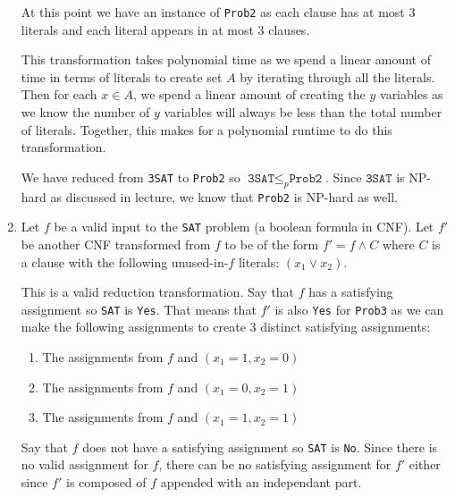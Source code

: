 \documentclass{article}
\begin{document}
\begin{enumerate}
                At this point we have an instance of \texttt{Prob2} as each clause has at most 3 literals and each literal appears in at most 3 clauses.
                

                This transformation takes polynomial time as we spend a linear amount of time in terms of literals to create set $A$ by iterating through all the literals.
                Then for each $x \in A$, we spend a linear amount of creating the $y$ variables as we know the number of $y$ variables will always be less than the total number of literals. 
                Together, this makes for a polynomial runtime to do this transformation.

                We have reduced from \texttt{3SAT} to \texttt{Prob2} so $\texttt{3SAT} \leq_p \texttt{Prob2}$. 
                Since $\texttt{3SAT}$ is NP-hard as discussed in lecture, we know that \texttt{Prob2} is NP-hard as well.
                
        \newpage
        \item Let $f$ be a valid input to the \texttt{SAT} problem (a boolean formula in CNF).
                 Let $f'$ be another CNF transformed from $f$ to be of the form $f' = f \land C$ where $C$ is a clause with the following unused-in-$f$ literals: $(x_1 \lor x_2)$.

                This is a valid reduction transformation. Say that $f$ has a satisfying assignment so \texttt{SAT} is \texttt{Yes}. That means that $f'$ is also \texttt{Yes} for \texttt{Prob3}
                as we can make the following assignments to create 3 distinct satisfying assignments:
                \begin{enumerate}
                        \item The assignments from $f$ and $(x_1 = 1, x_2 = 0)$
                        \item The assignments from $f$ and $(x_1 = 0, x_2 = 1)$
                        \item The assignments from $f$ and $(x_1 = 1, x_2 = 1)$
                \end{enumerate}

                Say that $f$ does not have a satisfying assignment so \texttt{SAT} is \texttt{No}. 
                Since there is no valid assignment for $f$, there can be no satisfying assignment for $f'$ either since $f'$ is composed of $f$ appended with an independant part.
                

\end{enumerate}
\end{document}
